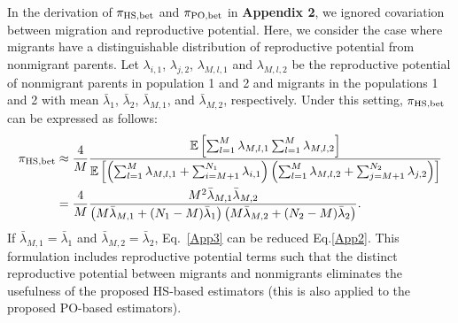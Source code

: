\documentclass[12pt, English]{article}
\begin{document}
\begin{spacing}{1.9}
In the derivation of $\pi_{\rm HS,bet}$ and $\pi_{\rm PO,bet}$ in {\bf Appendix 2}, we ignored covariation between migration and reproductive potential. Here, we consider the case where migrants have a distinguishable distribution of reproductive potential from nonmigrant parents. Let $\lambda_{i,1}$, $\lambda_{j,2}$, $\lambda_{M,l,1}$ and $\lambda_{M,l,2}$ be the reproductive potential of nonmigrant parents in population 1 and 2 and migrants in the populations 1 and 2 with mean ${\bar \lambda_{1}}$, ${\bar \lambda_{2}}$, ${\bar \lambda_{M,1}}$, and ${\bar \lambda_{M,2}}$, respectively. Under this setting, $\pi_{\rm HS,bet}$ can be expressed as follows:
\begin{align}
\pi_{\rm HS,bet} &\approx \frac{4}{M}  \frac{ \mathbb{E}\left[ \sum_{l=1}^M \lambda_{M,l,1} \sum_{l=1}^M \lambda_{M,l,2} \right]} {\mathbb{E}\left[ \left(\sum_{l=1}^{M} \lambda_{M,l,1} + \sum_{i=M+1}^{N_1} \lambda_{i,1}\right) \left(\sum_{l=1}^{M} \lambda_{M,l,2} + \sum_{j=M+1}^{N_2} \lambda_{j,2}\right) \right] }\nonumber\\ 
&= \frac{4}{M} \frac{ M^2 {\bar \lambda_{M,1}} {\bar \lambda_{M,2}} } { \left( M {\bar \lambda_{M,1}} + (N_1 - M) {\bar \lambda_1} \right) \left( M {\bar \lambda_{M,2}} + (N_2 - M) {\bar \lambda_2} \right)}.
\label{App3}
\end{align}
If ${\bar \lambda_{M,1}} = {\bar \lambda_{1}}$ and ${\bar \lambda_{M,2}} = {\bar \lambda_{2}}$, Eq.~\ref{App3} can be reduced Eq.\ref{App2}. This formulation includes reproductive potential terms such that the distinct reproductive potential between migrants and nonmigrants eliminates the usefulness of the proposed HS-based estimators (this is also applied to the proposed PO-based estimators). 

\clearpage




\end{spacing}
\end{document}
